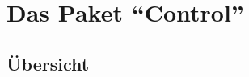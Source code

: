 \documentclass[parskip=full]{scrartcl}
\begin{document}
\section{Das Paket \enquote{Control}}
\label{Control}
\subsection{Übersicht}
\end{document}
